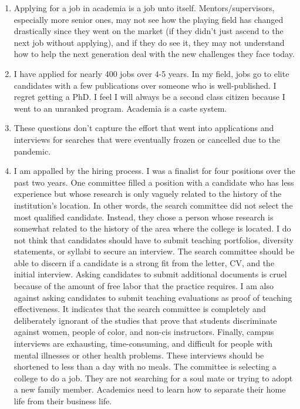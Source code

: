 \documentclass[]{article}
\begin{document}
\begin{enumerate}
\item
  Applying for a job in academia is a job unto itself.
  Mentors/supervisors, especially more senior ones, may not see how the
  playing field has changed drastically since they went on the market
  (if they didn't just ascend to the next job without applying), and if
  they do see it, they may not understand how to help the next
  generation deal with the new challenges they face today.
\item
  I have applied for nearly 400 jobs over 4-5 years. In my field, jobs
  go to elite candidates with a few publications over someone who is
  well-published. I regret getting a PhD. I feel I will always be a
  second class citizen because I went to an unranked program. Academia
  is a caste system.
\item
  These questions don't capture the effort that went into applications
  and interviews for searches that were eventually frozen or cancelled
  due to the pandemic.
\item
  I am appalled by the hiring process. I was a finalist for four
  positions over the past two years. One committee filled a position
  with a candidate who has less experience but whose research is only
  vaguely related to the history of the institution's location. In other
  words, the search committee did not select the most qualified
  candidate. Instead, they chose a person whose research is somewhat
  related to the history of the area where the college is located. I do
  not think that candidates should have to submit teaching portfolios,
  diversity statements, or syllabi to secure an interview. The search
  committee should be able to discern if a candidate is a strong fit
  from the letter, CV, and the initial interview. Asking candidates to
  submit additional documents is cruel because of the amount of free
  labor that the practice requires. I am also against asking candidates
  to submit teaching evaluations as proof of teaching effectiveness. It
  indicates that the search committee is completely and deliberately
  ignorant of the studies that prove that students discriminate against
  women, people of color, and non-cis instructors. Finally, campus
  interviews are exhausting, time-consuming, and difficult for people
  with mental illnesses or other health problems. These interviews
  should be shortened to less than a day with no meals. The committee is
  selecting a college to do a job. They are not searching for a soul
  mate or trying to adopt a new family member. Academics need to learn
  how to separate their home life from their business life.

\end{enumerate}
\end{document}
